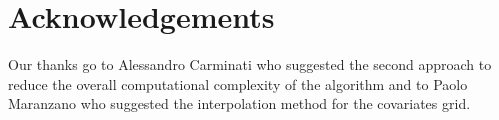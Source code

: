 \documentclass[11pt,a4paper]{article}
\begin{document}







\newpage



\section*{Acknowledgements}
Our thanks go to Alessandro Carminati who suggested the second approach to reduce the overall computational complexity of the algorithm and to Paolo Maranzano who suggested the interpolation method for the covariates grid.
\newpage
\end{document}
